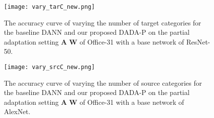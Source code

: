 \documentclass[letterpaper]{article} \usepackage{aaai20}  \usepackage{times}  \usepackage{helvet} \usepackage{courier}  \usepackage[hyphens]{url}  \usepackage{graphicx} \urlstyle{rm} \def\UrlFont{\rm}  \usepackage{graphicx}  \frenchspacing  \setlength{\pdfpagewidth}{8.5in}  \setlength{\pdfpageheight}{11in}
\begin{document}
\begin{figure}[t]
	\begin{center}
\texttt{[image: vary\_tarC\_new.png]}
	\end{center}
	\caption{The accuracy curve of varying the number of target categories for the baseline DANN \cite{dann} and our proposed DADA-P on the partial adaptation setting \textbf{A}  \textbf{W} of Office-31 with a base network of ResNet-50.}
	\label{fig:partial_vary_tarC}
\end{figure}

\begin{figure}[t]
	\begin{center}
\texttt{[image: vary\_srcC\_new.png]}
	\end{center}
	\caption{The accuracy curve of varying the number of source categories for the baseline DANN \cite{dann} and our proposed DADA-P on the partial adaptation setting \textbf{A}  \textbf{W} of Office-31 with a base network of AlexNet.}
	\label{fig:partial_vary_srcC}
\end{figure}

\begin{table*}[!htb]
	\begin{center}
		\caption{Results for partial domain adaptation on Office-31 based on AlexNet.}
		\label{table:results_office31_partial_transfer_alexnet}
	\end{center}
\end{table*}
\end{document}
